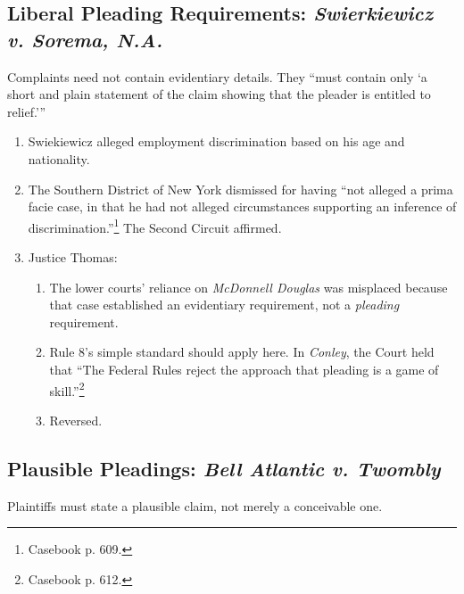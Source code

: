 \subsection{Liberal Pleading Requirements: \emph{Swierkiewicz v. Sorema, N.A.}}

Complaints need not contain evidentiary details. They \enquote{must contain 
only \enquote{a short and plain statement of the claim showing that the 
pleader is entitled to relief.}}

\begin{enumerate}
    \item Swiekiewicz alleged employment discrimination based on his age and 
    nationality.
    \item The Southern District of New York dismissed for having ``not alleged 
    a prima facie case, in that he had not alleged circumstances supporting an 
    inference of discrimination.''\footnote{Casebook p. 609.} The Second 
    Circuit affirmed.
    \item Justice Thomas:
    \begin{enumerate}
        \item The lower courts' reliance on \emph{McDonnell Douglas} was 
        misplaced because that case established an evidentiary requirement, 
        not a \emph{pleading} requirement.
        \item Rule 8's simple standard should apply here. In \emph{Conley}, 
        the Court held that ``The Federal Rules reject the approach that 
        pleading is a game of skill.''\footnote{Casebook p. 612.}
        \item Reversed.
    \end{enumerate}
\end{enumerate}

\subsection{Plausible Pleadings: \emph{Bell Atlantic v. Twombly}}

Plaintiffs must state a plausible claim, not merely a conceivable one.

